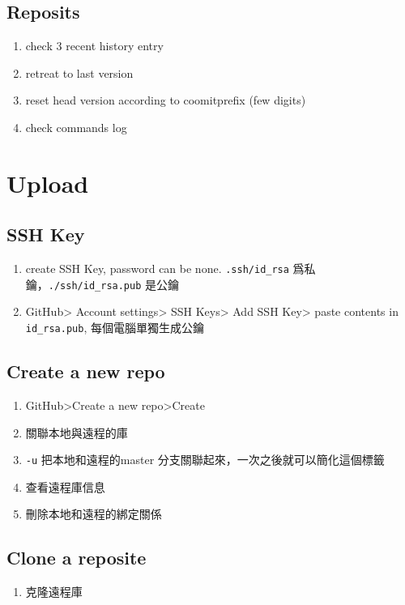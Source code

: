 \subsection{Reposits}
\begin{enumerate}
\item{} check 3 recent history entry
\item{} retreat to last version 
\item{} reset head version according to coomitprefix (few digits)
\item{} check commands log
\end{enumerate}

\section{Upload}
\subsection{SSH Key}
\begin{enumerate}
\item{} create SSH Key, password can be none. \verb|.ssh/id_rsa| 爲私鑰，\verb|./ssh/id_rsa.pub| 是公鑰
\item GitHub> Account settings> SSH Keys> Add SSH Key> paste contents in \verb|id_rsa.pub|, 每個電腦單獨生成公鑰
\end{enumerate}

\subsection{Create a new repo}
\begin{enumerate}
\item GitHub>Create a new repo>Create
\item{} 關聯本地與遠程的庫 
\item{} \verb|-u| 把本地和遠程的master 分支關聯起來，一次之後就可以簡化這個標籤
\item{} 查看遠程庫信息
\item{} 刪除本地和遠程的綁定關係
\end{enumerate}

\subsection{Clone a reposite}
\begin{enumerate}
\item{} 克隆遠程庫
\end{enumerate}

